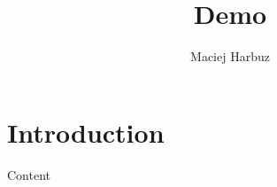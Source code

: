 \documentclass[12pt, a4paper]{article}
\title{Demo}
\author{Maciej Harbuz}
\begin{document}
\maketitle

\section{Introduction}
Content
\end{document}
